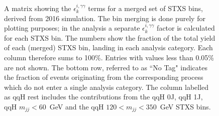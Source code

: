 \begin{figure}[hptb]
  \caption[Efficiency times acceptance matrix from 2016 simulation]
  {
    A matrix showing the $\epsilon^{i,\gamma\gamma}_{k}$ terms for a merged set of STXS bins, derived from 2016 simulation. The bin merging is done purely for plotting purposes; in the analysis a separate $\epsilon^{i,\gamma\gamma}_{k}$ factor is calculated for each STXS bin. The numbers show the fraction of the total yield of each (merged) STXS bin, landing in each analysis category. Each column therefore sums to 100\%. Entries with values less than 0.05\% are not shown. The bottom row, referred to as ``No Tag" indicates the fraction of events originating from the corresponding process which do not enter a single analysis category. The column labelled as qqH rest includes the contributions from the qqH 0J, qqH 1J, qqH $m_{jj}<60$~GeV and the qqH $120<m_{jj}<350$~GeV STXS bins.
  }
  \label{fig:ea_2016}
\end{figure}

